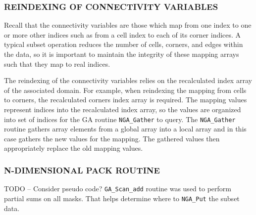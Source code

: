 \subsubsection{REINDEXING OF CONNECTIVITY VARIABLES}

Recall that the connectivity variables are those which map from one index to
one or more other indices such as from a cell index to each of its corner
indices.  A typical subset operation reduces the number of cells, corners, and
edges within the data, so it is important to maintain the integrity of these
mapping arrays such that they map to real indices.

The reindexing of the connectivity variables relies on the recalculated index
array of the associated domain.  For example, when reindexing the mapping from
cells to corners, the recalculated corners index array is required.  The
mapping values represent indices into the recalculated index array, so the
values are organized into set of indices for the GA routine \verb=NGA_Gather=
to query.  The \verb=NGA_Gather= routine gathers array elements from a global
array into a local array and in this case gathers the new values for the
mapping.  The gathered values then appropriately replace the old mapping
values.

\subsubsection{N-DIMENSIONAL PACK ROUTINE}

TODO -- Consider pseudo code?  \verb=GA_Scan_add= routine was used to perform
partial sums on all masks. That helps determine where to \verb=NGA_Put= the
subset data.

